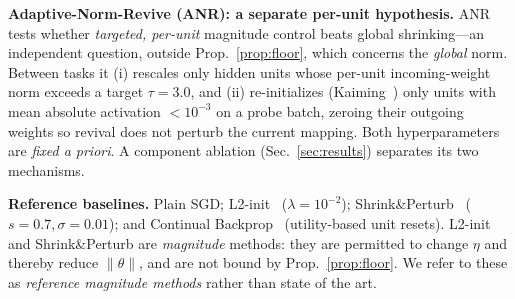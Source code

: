 \documentclass[conference]{IEEEtran}
\begin{document}
\textbf{Adaptive-Norm-Revive (ANR): a separate per-unit hypothesis.} ANR tests
whether \emph{targeted, per-unit} magnitude control beats global shrinking---an
independent question, outside Prop.~\ref{prop:floor}, which concerns the
\emph{global} norm. Between tasks it (i) rescales only hidden units whose per-unit
incoming-weight norm exceeds a target $\tau{=}3.0$, and (ii) re-initializes
(Kaiming~\cite{he2015}) only units with mean absolute activation $<10^{-3}$ on a probe batch,
zeroing their outgoing weights so revival does not perturb the current mapping. Both
hyperparameters are \emph{fixed a priori}. A component ablation
(Sec.~\ref{sec:results}) separates its two mechanisms.

\textbf{Reference baselines.} Plain SGD; L2-init~\cite{kumar2023}
($\lambda{=}10^{-2}$); Shrink\&Perturb~\cite{ash2020} ($s{=}0.7,\sigma{=}0.01$);
and Continual Backprop~\cite{dohare2024} (utility-based unit resets). L2-init and
Shrink\&Perturb are \emph{magnitude} methods: they are permitted to change $\eta$
and thereby reduce $\lVert\theta\rVert$, and are not bound by
Prop.~\ref{prop:floor}. We refer to these as \emph{reference magnitude methods}
rather than state of the art.
\end{document}
